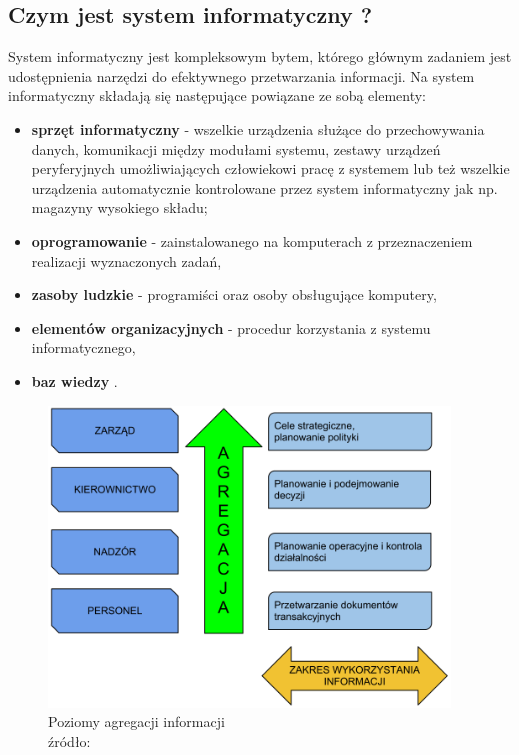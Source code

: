 	\subsection{Czym jest system informatyczny ?}
		System informatyczny jest kompleksowym bytem, którego głównym zadaniem 
		jest udos\-tępnienia narzędzi do efektywnego przetwarzania informacji. 
		Na system informatyczny składają się następujące powiązane ze sobą elementy:
		\begin{itemize}
			\item \textbf{sprzęt informatyczny} - wszelkie urządzenia służące
			do przechowywania danych, komunikacji między modułami systemu, zestawy urządzeń
			peryferyjnych umożliwiających człowiekowi pracę z systemem lub też wszelkie urządzenia
			automatycznie kontrolowane przez system informatyczny jak np. magazyny wysokiego składu;
			\item \textbf{oprogramowanie} - zainstalowanego na komputerach z przeznaczeniem realizacji
			wyznaczonych zadań,
			\item \textbf{zasoby ludzkie} - programiści oraz osoby obsługujące komputery,
			\item \textbf{elementów organizacyjnych} - procedur korzystania z systemu informatycznego,
			\item \textbf{baz wiedzy} \cite{logistyka_w_przedsiebiorstwie}.
		\end{itemize}
		\begin{figure}[H]
			\centering
			\includegraphics[width=0.95\textwidth]{images/poziomy_agregacji_informacji}
			\caption[Poziomy agregacji informacji w systemie informatycznym]{
				Poziomy agregacji informacji\\ 
				źródło: \cite{IDL}
			}
			\label{c3:information_level_figure}
		\end{figure}
